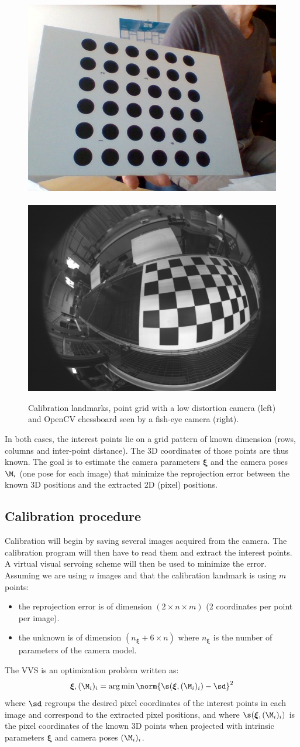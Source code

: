 \documentclass{ecnreport}
\begin{document}
\begin{figure}[h!]
 \includegraphics[width=.45\linewidth]{grid} ~~\includegraphics[width=.45\linewidth]{chessboard}
 \caption{Calibration landmarks, point grid with a low distortion camera (left) and OpenCV chessboard seen by a fish-eye camera (right).}
 \label{fig:landmarks}
\end{figure}

\newcommand{\xii}{{\boldsymbol{\xi}}}

In both cases, the interest points lie on a grid pattern of known dimension (rows, columns and inter-point distance). The 3D coordinates of those points
are thus known. The goal is to estimate the camera parameters $\xii$ and the camera poses $\M_i$ (one pose for each image) that minimize the reprojection error between the known 3D positions
and the extracted 2D (pixel) positions.

\subsection{Calibration procedure}

Calibration will begin by saving several images acquired from the camera. The calibration program will then have to read them and extract the interest
points. A virtual visual servoing scheme will then be used to minimize the error.
Assuming we are using $n$ images and that the calibration landmark is using $m$ points:
\begin{itemize}
 \item the reprojection error is of dimension $(2\times n\times m)$ (2 coordinates per point per image).
 \item the unknown is of dimension $(n_\xii + 6\times n)$ where $n_\xii$ is the number of parameters of the camera model.
\end{itemize}
The VVS is an optimization problem written as:
\begin{equation}\label{eq:calib}
 \xii, (\M_i)_i = \arg\min \norm{\s(\xii, (\M_i)_i) - \sd}^2
\end{equation}
where $\sd$ regroups the desired pixel coordinates of the interest points in each image and correspond to the extracted pixel positions, 
and where $\s(\xii, (\M_i)_i)$ is the pixel coordinates of the known 3D points when projected with intrinsic parameters $\xii$ and camera poses $(\M_i)_i$.
\end{document}
